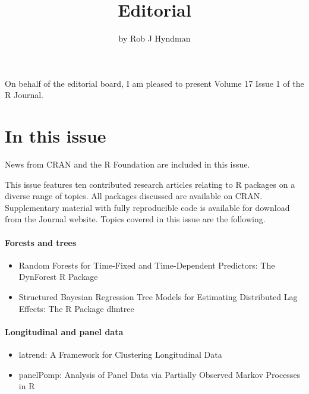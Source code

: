 \title{Editorial}


\author{by Rob J Hyndman}

\maketitle


On behalf of the editorial board, I am pleased to present Volume 17 Issue 1 of
the R Journal.

\section*{In this issue}\label{in-this-issue}

News from CRAN and the R Foundation are included in this issue.

This issue features ten contributed research articles relating to R
packages on a diverse range of topics. All packages discussed are available on CRAN.
Supplementary material with fully reproducible code is available for download
from the Journal website. Topics covered in this issue are the following.

\paragraph{Forests and trees}\label{forests-and-trees}

\begin{itemize}
\tightlist
\item
  Random Forests for Time-Fixed and Time-Dependent Predictors: The DynForest R Package
\item
  Structured Bayesian Regression Tree Models for Estimating Distributed Lag Effects: The R Package dlmtree
\end{itemize}

\paragraph{Longitudinal and panel data}\label{longitudinal-and-panel-data}

\begin{itemize}
\tightlist
\item
  latrend: A Framework for Clustering Longitudinal Data
\item
  panelPomp: Analysis of Panel Data via Partially Observed Markov Processes in R
\end{itemize}

